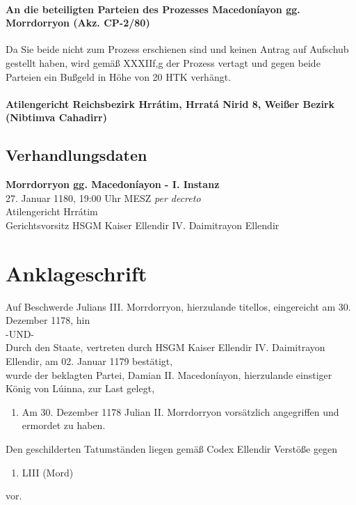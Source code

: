 \documentclass{article}
\begin{document}
\paragraph{An die beteiligten Parteien des Prozesses Macedoníayon gg. Morrdorryon (Akz. CP-2/80)\\}
Da Sie beide nicht zum Prozess erschienen sind und keinen Antrag auf Aufschub gestellt haben, wird gemäß XXXIIf,g der Prozess vertagt und gegen beide Parteien ein Bußgeld in Höhe von 20 HTK verhängt.
\paragraph{Atilengericht Reichsbezirk Hrrátim, Hrratá Nirid 8, Weißer Bezirk (Nibtimva Cahadirr)}
\newpage
\subsection{Verhandlungsdaten}
\textbf{Morrdorryon gg. Macedoníayon - I. Instanz}\\
27. Januar 1180, 19:00 Uhr MESZ \textit{per decreto}\\
Atilengericht Hrrátim\\
Gerichtsvorsitz HSGM Kaiser Ellendir IV. Daimitrayon Ellendir

\newpage
\section{Anklageschrift}
Auf Beschwerde Julians III. Morrdorryon, hierzulande titellos, eingereicht am 30. Dezember 1178, hin\\
-UND-\\
Durch den Staate, vertreten durch HSGM Kaiser Ellendir IV. Daimitrayon Ellendir, am 02. Januar 1179 bestätigt,\\
wurde der beklagten Partei, Damian II. Macedoníayon, hierzulande einstiger König von Lúinna, zur Last gelegt,
\begin{enumerate}
    \item Am 30. Dezember 1178 Julian II. Morrdorryon vorsätzlich angegriffen und ermordet zu haben.
\end{enumerate}

Den geschilderten Tatumständen liegen gemäß Codex Ellendir Verstöße gegen

\begin{enumerate}
    \item LIII (Mord)
\end{enumerate}

vor.\\\\
\end{document}
